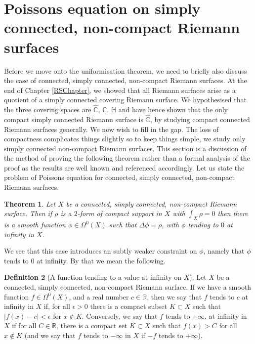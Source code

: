 \documentclass[11pt]{report}
\newtheorem{thm}{Theorem}[section]
\theoremstyle{definition}
\newtheorem{defn}[thm]{Definition}
\begin{document}
\section{Poissons equation on simply connected, non-compact Riemann surfaces}
Before we move onto the uniformisation theorem, we need to briefly also discuss the case of connected, simply connected, non-compact Riemann surfaces. At the end of Chapter \ref{RSChapter}, we showed that all Riemann surfaces arise as a quotient of a simply connected covering Riemann surface. We hypothesised that the three covering spaces are $\widehat{\mathbb{C}} ,\, \mathbb{C},\,\mathbb{H}$ and have hence shown that the only compact simply connected Riemann surface is $\widehat{\mathbb{C}}$, by studying compact connected Riemann surfaces generally. We now wish to fill in the gap. The loss of compactness complicates things slightly so to keep things simple, we study only simply connected non-compact Riemann surfaces.
This section is a discussion of the method of proving the following theorem rather than a formal analysis of the proof as the results are well known and referenced accordingly.
Let us state the problem of Poissons equation for connected, simply connected, non-compact Riemann surfaces.
\begin{thm}\label{NonCompactPoissons}
  Let $X$ be a connected, simply connected, non-compact Riemann surface. Then if $\rho$ is a $2$-form of compact support in $X$ with $\int_X \rho = 0$ then there is a smooth function $\phi \in \Omega^0(X)$ such that $\Delta \phi = \rho$, with $\phi$ tending to $0$ at infinity in $X$.
\end{thm}
We see that this case introduces an subtly weaker constraint on $\phi$, namely that $\phi$ tends to $0$ at infinity. By that we mean the following.
\begin{defn}[A function tending to a value at infinity on $X$]
  Let $X$ be a connected, simply connected, non-compact Riemann surface. If we have a smooth function $f \in \Omega^0(X)$, and a real number $c \in \mathbb{R}$, then we say that $f$ tends to $c$ at infinity in $X$ if, for all $\epsilon > 0$ there is a compact subset $K \subset X$ such that $|f(x) - c| < \epsilon$ for $x \notin K$.
  Conversely, we say that $f$ tends to $+\infty$, at infinity in $X$ if for all $C \in \mathbb{R}$, there is a compact set $K \subset X$ such that $f(x) > C$ for all $x \notin K$ (and we say that $f$ tends to $-\infty$ in $X$ if $-f$ tends to $+\infty$).
\end{defn}
\end{document}
